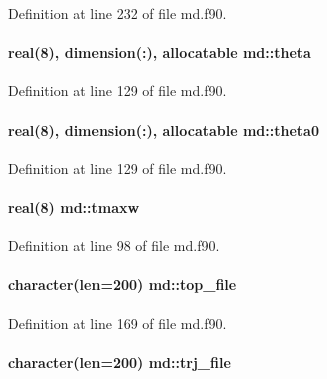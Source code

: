 Definition at line 232 of file md.\-f90.

\hypertarget{classmd_a2c4dd1237d2d9dfd2fc0b7e0fc2982b9}{
\paragraph[{theta}]{\setlength{\rightskip}{0pt plus 5cm}real(8), dimension(\-:), allocatable md\-::theta}}\label{classmd_a2c4dd1237d2d9dfd2fc0b7e0fc2982b9}


Definition at line 129 of file md.\-f90.

\hypertarget{classmd_a7a9a5e46cd47f2cbce7f1efd82c22a4f}{
\paragraph[{theta0}]{\setlength{\rightskip}{0pt plus 5cm}real(8), dimension(\-:), allocatable md\-::theta0}}\label{classmd_a7a9a5e46cd47f2cbce7f1efd82c22a4f}


Definition at line 129 of file md.\-f90.

\hypertarget{classmd_ac8831874fbf44af6732e4d6c1af21c7a}{
\paragraph[{tmaxw}]{\setlength{\rightskip}{0pt plus 5cm}real(8) md\-::tmaxw}}\label{classmd_ac8831874fbf44af6732e4d6c1af21c7a}


Definition at line 98 of file md.\-f90.

\hypertarget{classmd_a46f549758ec3148237a341951a9c02a4}{
\paragraph[{top\-\_\-file}]{\setlength{\rightskip}{0pt plus 5cm}character(len=200) md\-::top\-\_\-file}}\label{classmd_a46f549758ec3148237a341951a9c02a4}


Definition at line 169 of file md.\-f90.

\hypertarget{classmd_ae684afdb0c2352b58428881c6475a529}{
\paragraph[{trj\-\_\-file}]{\setlength{\rightskip}{0pt plus 5cm}character(len=200) md\-::trj\-\_\-file}}\label{classmd_ae684afdb0c2352b58428881c6475a529}


